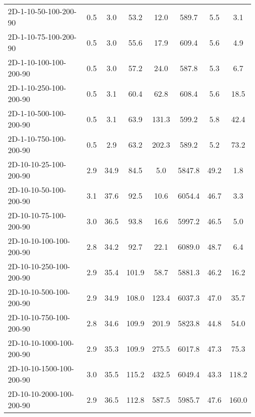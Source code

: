 \documentclass{article}
\begin{document}
\begin{table}[h]
\begin{center}
\begin{tabular}{|l||c|c|c|c|c|c|c|}
            2D-1-10-50-100-200-90         & 0.5  & 3.0       & 53.2       & 12.0        & 589.7    & 5.5       & 3.1        \\
            2D-1-10-75-100-200-90         & 0.5  & 3.0       & 55.6       & 17.9        & 609.4    & 5.6       & 4.9        \\
            2D-1-10-100-100-200-90        & 0.5  & 3.0       & 57.2       & 24.0        & 587.8    & 5.3       & 6.7        \\
            2D-1-10-250-100-200-90        & 0.5  & 3.1       & 60.4       & 62.8        & 608.4    & 5.6       & 18.5       \\
            2D-1-10-500-100-200-90        & 0.5  & 3.1       & 63.9       & 131.3       & 599.2    & 5.8       & 42.4       \\
            2D-1-10-750-100-200-90        & 0.5  & 2.9       & 63.2       & 202.3       & 589.2    & 5.2       & 73.2       \\
            \hline
            2D-10-10-25-100-200-90        & 2.9  & 34.9      & 84.5       & 5.0         & 5847.8   & 49.2      & 1.8        \\
            2D-10-10-50-100-200-90        & 3.1  & 37.6      & 92.5       & 10.6        & 6054.4   & 46.7      & 3.3        \\
            2D-10-10-75-100-200-90        & 3.0  & 36.5      & 93.8       & 16.6        & 5997.2   & 46.5      & 5.0        \\
            2D-10-10-100-100-200-90       & 2.8  & 34.2      & 92.7       & 22.1        & 6089.0   & 48.7      & 6.4        \\
            2D-10-10-250-100-200-90       & 2.9  & 35.4      & 101.9      & 58.7        & 5881.3   & 46.2      & 16.2       \\
            2D-10-10-500-100-200-90       & 2.9  & 34.9      & 108.0      & 123.4       & 6037.3   & 47.0      & 35.7       \\
            2D-10-10-750-100-200-90       & 2.8  & 34.6      & 109.9      & 201.9       & 5823.8   & 44.8      & 54.0       \\
            2D-10-10-1000-100-200-90      & 2.9  & 35.3      & 109.9      & 275.5       & 6017.8   & 47.3      & 75.3       \\
            2D-10-10-1500-100-200-90      & 3.0  & 35.5      & 115.2      & 432.5       & 6049.4   & 43.3      & 118.2      \\
            2D-10-10-2000-100-200-90      & 2.9  & 36.5      & 112.8      & 587.5       & 5985.7   & 47.6      & 160.0      \\

\end{tabular}
\end{center}
\end{table}
\end{document}
